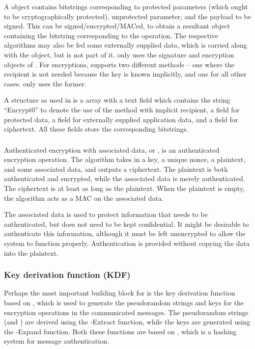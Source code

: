 A \mCose object contains bitstrings corresponding to protected parameters (which ought to be cryptographically protected), unprotected parameter, and the payload to be signed. This can be signed/encrypted/MACed, to obtain a resultant \mCose object containing the bitstring corresponding to the operation. The respective algorithms may also be fed some externally supplied data, which is carried along with the \mCose object, but is not part of it. \mEdhoc only uses the signature and encryption objects of \mCose. For encryptions, \mCose supports two different methods -- one where the recipient is not needed because the key is known implicitly, and one for all other cases. \mEdhoc only uses the former. 

A \mCoseEncrypt structure as used in \mEdhoc is a \mCbor array with a text field which contains the string ``Encrypt0'' to denote the use of the method with implicit recipient, a field for protected data, a field for externally supplied application data, and a field for ciphertext. All these fields store the corresponding bitstrings.

\subsubsection{\mAead}
Authenticated encryption with associated data, or \mAead, is an authenticated encryption operation. The algorithm takes in a key, a unique nonce, a plaintext, and some associated data, and outputs a ciphertext. The plaintext is both authenticated and encrypted, while the associated data is merely authenticated. The ciphertext is at least as long as the plaintext. When the plaintext is empty, the \mAead algorithm acts as a MAC on the associated data. 

The associated data is used to protect information that needs to be authenticated, but does not need to be kept confidential. It might be desirable to authenticate this information, although it must be left unencrypted to allow the system to function properly. Authentication is provided without copying the data into the plaintext.

\subsubsection{Key derivation function (KDF)}
Perhaps the most important building block for \mEdhoc is the key derivation function based on \mHkdf [\mcneed], which is used to generate the pseudorandom strings and keys for the encryption operations in the communicated messages. The pseudorandom strings (\mPRKtwo and \mPRKthree) are derived using the \mHkdf-Extract function, while the keys are generated using the \mHkdf-Expand function. Both these functions are based on \mHmac [\mcneed], which is a hashing system for message authentication.


